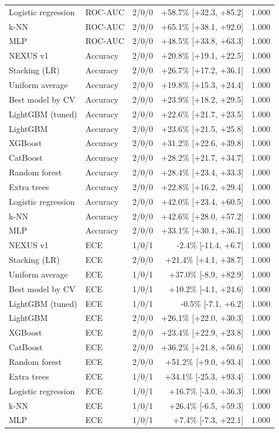 \begin{tabular}{llcrr}
Logistic regression & ROC-AUC & 2/0/0 & +58.7\% [+32.3, +85.2] & 1.000\\
k-NN & ROC-AUC & 2/0/0 & +65.1\% [+38.1, +92.0] & 1.000\\
MLP & ROC-AUC & 2/0/0 & +48.5\% [+33.8, +63.3] & 1.000\\
NEXUS v1 & Accuracy & 2/0/0 & +20.8\% [+19.1, +22.5] & 1.000\\
Stacking (LR) & Accuracy & 2/0/0 & +26.7\% [+17.2, +36.1] & 1.000\\
Uniform average & Accuracy & 2/0/0 & +19.8\% [+15.3, +24.4] & 1.000\\
Best model by CV & Accuracy & 2/0/0 & +23.9\% [+18.2, +29.5] & 1.000\\
LightGBM (tuned) & Accuracy & 2/0/0 & +22.6\% [+21.7, +23.5] & 1.000\\
LightGBM & Accuracy & 2/0/0 & +23.6\% [+21.5, +25.8] & 1.000\\
XGBoost & Accuracy & 2/0/0 & +31.2\% [+22.6, +39.8] & 1.000\\
CatBoost & Accuracy & 2/0/0 & +28.2\% [+21.7, +34.7] & 1.000\\
Random forest & Accuracy & 2/0/0 & +28.4\% [+23.4, +33.3] & 1.000\\
Extra trees & Accuracy & 2/0/0 & +22.8\% [+16.2, +29.4] & 1.000\\
Logistic regression & Accuracy & 2/0/0 & +42.0\% [+23.4, +60.5] & 1.000\\
k-NN & Accuracy & 2/0/0 & +42.6\% [+28.0, +57.2] & 1.000\\
MLP & Accuracy & 2/0/0 & +33.1\% [+30.1, +36.1] & 1.000\\
NEXUS v1 & ECE & 1/0/1 & -2.4\% [-11.4, +6.7] & 1.000\\
Stacking (LR) & ECE & 2/0/0 & +21.4\% [+4.1, +38.7] & 1.000\\
Uniform average & ECE & 1/0/1 & +37.0\% [-8.9, +82.9] & 1.000\\
Best model by CV & ECE & 1/0/1 & +10.2\% [-4.1, +24.6] & 1.000\\
LightGBM (tuned) & ECE & 1/0/1 & -0.5\% [-7.1, +6.2] & 1.000\\
LightGBM & ECE & 2/0/0 & +26.1\% [+22.0, +30.3] & 1.000\\
XGBoost & ECE & 2/0/0 & +23.4\% [+22.9, +23.8] & 1.000\\
CatBoost & ECE & 2/0/0 & +36.2\% [+21.8, +50.6] & 1.000\\
Random forest & ECE & 2/0/0 & +51.2\% [+9.0, +93.4] & 1.000\\
Extra trees & ECE & 1/0/1 & +34.1\% [-25.3, +93.4] & 1.000\\
Logistic regression & ECE & 1/0/1 & +16.7\% [-3.0, +36.3] & 1.000\\
k-NN & ECE & 1/0/1 & +26.4\% [-6.5, +59.3] & 1.000\\
MLP & ECE & 1/0/1 & +7.4\% [-7.3, +22.1] & 1.000\\
\bottomrule
\end{tabular}
